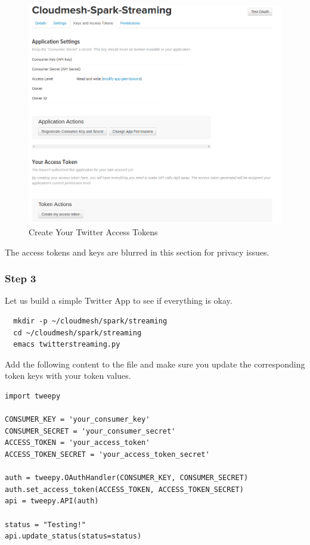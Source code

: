 \begin{figure}[htbp]\label{fig:twitter-app-access-token}
\centering
\includegraphics[width=1.0\textwidth]{images/twitter-create-token.png}
\caption{Create Your Twitter Access Tokens}
\end{figure}

\begin{NOTE}
The access tokens and keys are blurred in this section for privacy issues.   
\end{NOTE}

\subsubsection{Step 3}

Let us build a simple Twitter App to see if everything is okay.

\begin{lstlisting}
  mkdir -p ~/cloudmesh/spark/streaming
  cd ~/cloudmesh/spark/streaming
  emacs twitterstreaming.py
\end{lstlisting}

Add the following content to the file and make sure you update the
corresponding token keys with your token values.

\begin{lstlisting}
import tweepy

CONSUMER_KEY = 'your_consumer_key'
CONSUMER_SECRET = 'your_consumer_secret'
ACCESS_TOKEN = 'your_access_token'
ACCESS_TOKEN_SECRET = 'your_access_token_secret'

auth = tweepy.OAuthHandler(CONSUMER_KEY, CONSUMER_SECRET)
auth.set_access_token(ACCESS_TOKEN, ACCESS_TOKEN_SECRET)
api = tweepy.API(auth)

status = "Testing!"
api.update_status(status=status)
\end{lstlisting}

